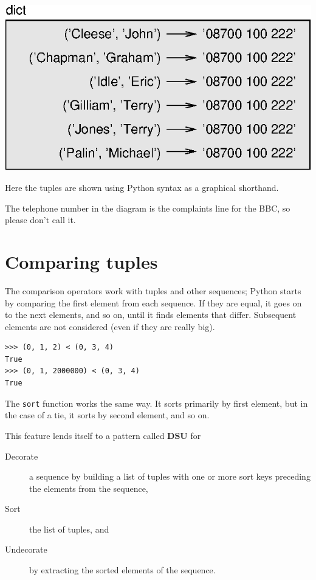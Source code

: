 \documentclass[10pt]{book}
\begin{document}
\beforefig
\centerline{\includegraphics{figs/dict2.eps}}
\afterfig

Here the tuples are shown using Python syntax as a graphical
shorthand.

The telephone number in the diagram is the complaints line for the
BBC, so please don't call it.



\section{Comparing tuples}


The comparison operators work with tuples and other sequences;
Python starts by comparing the first element from each
sequence.  If they are equal, it goes on to the next elements,
and so on, until it finds elements that differ.  Subsequent
elements are not considered (even if they are really big).

\beforeverb
\begin{verbatim}
>>> (0, 1, 2) < (0, 3, 4)
True
>>> (0, 1, 2000000) < (0, 3, 4)
True
\end{verbatim}
\afterverb
%
The {\tt sort} function works the same way.  It sorts 
primarily by first element, but in the case of a tie, it sorts
by second element, and so on.  

This feature lends itself to a pattern called {\bf DSU} for 

\begin{description}

\item[Decorate] a sequence by building a list of tuples
with one or more sort keys preceding the elements from the sequence,

\item[Sort] the list of tuples, and

\item[Undecorate] by extracting the sorted elements of the sequence.

\end{description}
\end{document}
